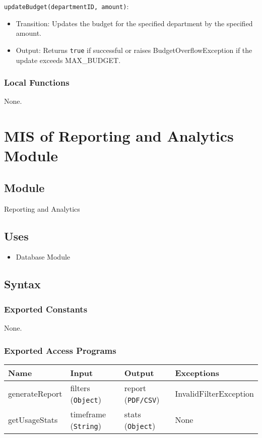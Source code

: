 \documentclass[12pt, titlepage]{article}
\begin{document}
\noindent \texttt{updateBudget(departmentID, amount)}:
\begin{itemize}
    \item Transition: Updates the budget for the specified department by the specified amount.
    \item Output: Returns \texttt{true} if successful or raises BudgetOverflowException if the update exceeds MAX\_BUDGET.
\end{itemize}

\subsubsection{Local Functions}
None.

\section{MIS of Reporting and Analytics Module}

\subsection{Module}
Reporting and Analytics

\subsection{Uses}
\begin{itemize}
    \item Database Module
\end{itemize}

\subsection{Syntax}
\subsubsection{Exported Constants}
None.

\subsubsection{Exported Access Programs}
\begin{center}
    \scriptsize
    \begin{tabular}{p{2cm} p{4cm} p{4cm} p{2cm}}
        \hline
        \textbf{Name} & \textbf{Input} & \textbf{Output} & \textbf{Exceptions} \\
        \hline
        generateReport & filters (\texttt{Object}) & report (\texttt{PDF/CSV}) & InvalidFilterException \\
        getUsageStats & timeframe (\texttt{String}) & stats (\texttt{Object}) & None \\
        \hline
    \end{tabular}
\end{center}
\end{document}
